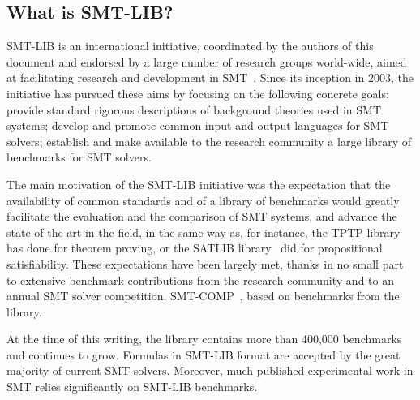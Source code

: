 \subsection{What is SMT-LIB?}




SMT-LIB is an international initiative,
coordinated by the authors of this document and 
endorsed by a large number of research groups world-wide,
aimed at facilitating research and development in SMT~\cite{SMT-LIB}.
Since its inception in 2003, the initiative has pursued these aims
by focusing on the following concrete goals:
provide standard rigorous descriptions of background theories used in SMT systems;
develop and promote common input and output languages for SMT solvers;
establish and make available to the research community a large library of
benchmarks for SMT solvers. 

The main motivation of the SMT-LIB initiative was the expectation that 
the availability of common standards and of a library of benchmarks would 
greatly facilitate the evaluation and the comparison of SMT systems,
and advance the state of the art in the field,
in the same way as, for instance,
the TPTP library~\cite{Sut-JAR-09} has done for theorem proving,
or the SATLIB library~\cite{HooStu-SAT-00} did 
for propositional satisfiability.
These expectations have been largely met, 
thanks in no small part 
to extensive benchmark contributions from the research community and
to an annual SMT solver competition, SMT-COMP~\cite{BardMS-CAV-05},
based on benchmarks from the library.

At the time of this writing, 
the library contains more than 400,000 benchmarks and continues to grow.
Formulas in SMT-LIB format are accepted by the great majority 
of current SMT solvers.
Moreover, much published experimental work in SMT relies significantly 
on SMT-LIB benchmarks.


